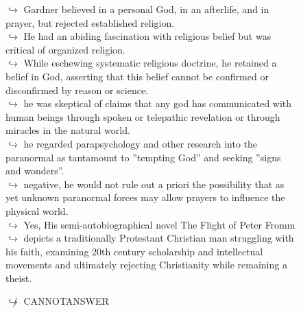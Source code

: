 \documentclass[11pt,a4paper, onecolumn]{article}
\begin{document}
\begin{figure}[t] \small \begin{tcolorbox}[boxsep=0pt,left=5pt,right=0pt,top=2pt,colback = yellow!5] \begin{dialogue}
 \small 
\colorbox{pink!25}{$\hookrightarrow$}
{ Gardner believed in a personal God, in an afterlife, and in prayer, but rejected established religion. }
\\
\colorbox{pink!25}{$\hookrightarrow$}
{ He had an abiding fascination with religious belief but was critical of organized religion. }
\\
\colorbox{pink!25}{$\hookrightarrow$}
{ While eschewing systematic religious doctrine, he retained a belief in God, asserting that this belief cannot be confirmed or disconfirmed by reason or science. }
\\
\colorbox{pink!25}{$\hookrightarrow$}
{ he was skeptical of claims that any god has communicated with human beings through spoken or telepathic revelation or through miracles in the natural world. }
\\
\colorbox{pink!25}{$\hookrightarrow$}
{ he regarded parapsychology and other research into the paranormal as tantamount to ''tempting God'' and seeking ''signs and wonders''. }
\\
\colorbox{pink!25}{$\hookrightarrow$}
{ negative, he would not rule out a priori the possibility that as yet unknown paranormal forces may allow prayers to influence the physical world. }
\\
\colorbox{pink!25}{$\hookrightarrow$}
\colorbox{red!25}{Yes,}
{ His semi-autobiographical novel The Flight of Peter Fromm }
\\
\colorbox{pink!25}{$\hookrightarrow$}
{ depicts a traditionally Protestant Christian man struggling with his faith, examining 20th century scholarship and intellectual movements and ultimately rejecting Christianity while remaining a theist. }
 \end{dialogue}\end{tcolorbox}\end{figure}\begin{figure}[t] \small \begin{tcolorbox}[boxsep=0pt,left=5pt,right=0pt,top=2pt,colback = yellow!5] \begin{dialogue}
 \small 
\colorbox{pink!25}{$\not\hookrightarrow$}
{ CANNOTANSWER }
\\
 \end{dialogue}\end{tcolorbox}\end{figure}
\end{document}
